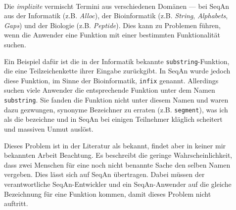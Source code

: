 \begin{itemize}
\begin{description}
\begin{description}
      \item[] \textbf{} \\
      Die \textit{implizite}   vermischt Termini aus verschiedenen Domänen --- bei SeqAn aus der Informatik (z.B. \textit{Alloc}), der Bioinformatik (z.B. \textit{String}, \textit{Alphabets}, \textit{Gaps}) und der Biologie (z.B. \textit{Peptide}). Dies kann zu Problemen führen, wenn die Anwender eine Funktion mit einer bestimmten Funktionalität suchen.
      
      Ein Beispiel dafür ist die in der Informatik bekannte \texttt{substring}-Funktion, die eine Teilzeichenkette ihrer Eingabe zurückgibt. In SeqAn wurde jedoch diese Funktion, im Sinne der Bioinformatik, \texttt{infix} genannt. Allerdings suchen viele Anwender die entsprechende Funktion unter dem Namen \texttt{substring}. Sie fanden die Funktion nicht unter diesem Namen und waren dazu gezwungen, synonyme Bezeichner zu erraten (z.B. \texttt{segment}), was ich als die   bezeichne und in SeqAn bei einigen Teilnehmer kläglich scheitert und massiven Unmut auslöst.
      
      Dieses Problem ist in der Literatur \citep[siehe ,][]{Good:1984kr,Furnas:1987hl} als  bekannt, findet aber in keiner mir bekannten Arbeit Beachtung. Es beschreibt die geringe Wahrscheinlichkeit, dass zwei Menschen für eine noch nicht benannte Sache den selben Namen vergeben. Dies lässt sich auf SeqAn übertragen. Dabei müssen der verantwortliche SeqAn-Entwickler und ein SeqAn-Anwender auf die gleiche Bezeichnung für eine Funktion kommen, damit dieses Problem nicht auftritt.
      

\end{description}
\end{description}
\end{itemize}
